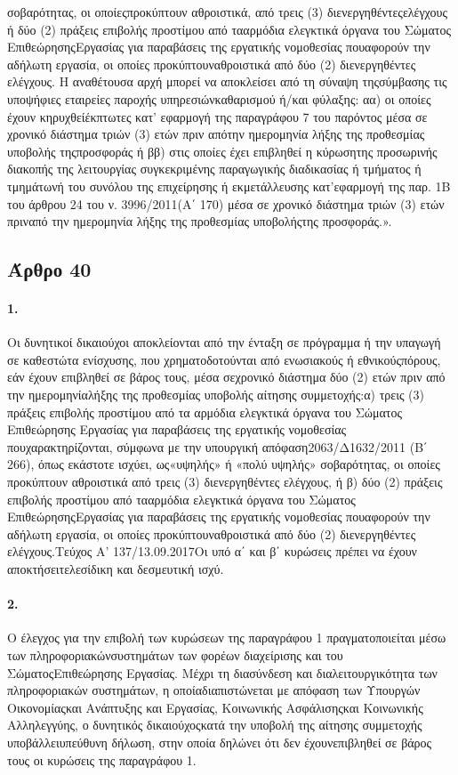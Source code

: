 \documentclass[a4paper,oneside, 10pt]{book}
\begin{document}
σοβαρότητας, οι οποίεςπροκύπτουν αθροιστικά, από τρεις (3) διενεργηθέντεςελέγχους ή δύο (2) πράξεις επιβολής προστίμου από τααρμόδια ελεγκτικά όργανα του Σώματος ΕπιθεώρησηςΕργασίας για παραβάσεις της εργατικής νομοθεσίας πουαφορούν την αδήλωτη εργασία, οι οποίες προκύπτουναθροιστικά από δύο (2) διενεργηθέντες ελέγχους. Η αναθέτουσα αρχή μπορεί να αποκλείσει από τη σύναψη τηςσύμβασης τις υποψήφιες εταιρείες παροχής υπηρεσιώνκαθαρισμού ή/και φύλαξης: αα) οι οποίες έχουν κηρυχθείέκπτωτες κατ’ εφαρμογή της παραγράφου 7 του παρόντος μέσα σε χρονικό διάστημα τριών (3) ετών πριν απότην ημερομηνία λήξης της προθεσμίας υποβολής τηςπροσφοράς ή ββ) στις οποίες έχει επιβληθεί η κύρωσητης προσωρινής διακοπής της λειτουργίας συγκεκριμένης παραγωγικής διαδικασίας ή τμήματος ή τμημάτωνή του συνόλου της επιχείρησης ή εκμετάλλευσης κατ’εφαρμογή της παρ. 1Β του άρθρου 24 του ν. 3996/2011(Α΄ 170) μέσα σε χρονικό διάστημα τριών (3) ετών πριναπό την ημερομηνία λήξης της προθεσμίας υποβολήςτης προσφοράς.».
\subsection*{ Άρθρο 40 }
\paragraph { 1. } Οι δυνητικοί δικαιούχοι αποκλείονται από την ένταξη σε πρόγραμμα ή την υπαγωγή σε καθεστώτα ενίσχυσης, που χρηματοδοτούνται από ενωσιακούς ή εθνικούςπόρους, εάν έχουν επιβληθεί σε βάρος τους, μέσα σεχρονικό διάστημα δύο (2) ετών πριν από την ημερομηνίαλήξης της προθεσμίας υποβολής αίτησης συμμετοχής:α) τρεις (3) πράξεις επιβολής προστίμου από τα αρμόδια ελεγκτικά όργανα του Σώματος Επιθεώρησης Εργασίας για παραβάσεις της εργατικής νομοθεσίας πουχαρακτηρίζονται, σύμφωνα με την υπουργική απόφαση2063/Δ1632/2011 (Β΄ 266), όπως εκάστοτε ισχύει, ως«υψηλής» ή «πολύ υψηλής» σοβαρότητας, οι οποίες προκύπτουν αθροιστικά από τρεις (3) διενεργηθέντες ελέγχους, ή β) δύο (2) πράξεις επιβολής προστίμου από τααρμόδια ελεγκτικά όργανα του Σώματος ΕπιθεώρησηςΕργασίας για παραβάσεις της εργατικής νομοθεσίας πουαφορούν την αδήλωτη εργασία, οι οποίες προκύπτουναθροιστικά από δύο (2) διενεργηθέντες ελέγχους.Τεύχος Α’ 137/13.09.2017Οι υπό α΄ και β΄ κυρώσεις πρέπει να έχουν αποκτήσειτελεσίδικη και δεσμευτική ισχύ.
\paragraph { 2. } Ο έλεγχος για την επιβολή των κυρώσεων της παραγράφου 1 πραγματοποιείται μέσω των πληροφοριακώνσυστημάτων των φορέων διαχείρισης και του ΣώματοςΕπιθεώρησης Εργασίας. Μέχρι τη διασύνδεση και διαλειτουργικότητα των πληροφοριακών συστημάτων, η οποίαδιαπιστώνεται με απόφαση των Υπουργών Οικονομίαςκαι Ανάπτυξης και Εργασίας, Κοινωνικής Ασφάλισηςκαι Κοινωνικής Αλληλεγγύης, ο δυνητικός δικαιούχοςκατά την υποβολή της αίτησης συμμετοχής υποβάλλειυπεύθυνη δήλωση, στην οποία δηλώνει ότι δεν έχουνεπιβληθεί σε βάρος τους οι κυρώσεις της παραγράφου 1.
\end{document}
